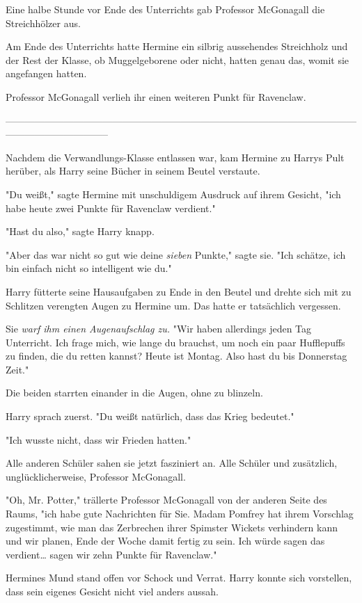 {Eine halbe Stunde vor Ende des Unterrichts gab Professor McGonagall die Streichhölzer aus.

Am Ende des Unterrichts hatte Hermine ein silbrig aussehendes Streichholz und der Rest der Klasse, ob Muggelgeborene oder nicht, hatten genau das, womit sie angefangen hatten.

Professor McGonagall verlieh ihr einen weiteren Punkt für Ravenclaw.

--------------------------------------------------------------------------------------------------------------------------------------------

Nachdem die Verwandlungs-Klasse entlassen war, kam Hermine zu Harrys Pult herüber, als Harry seine Bücher in seinem Beutel verstaute.

"Du weißt," sagte Hermine mit unschuldigem Ausdruck auf ihrem Gesicht, "ich habe heute zwei Punkte für Ravenclaw verdient."

"Hast du also," sagte Harry knapp.

"Aber das war nicht so gut wie deine \emph{sieben} Punkte," sagte sie. "Ich schätze, ich bin einfach nicht so intelligent wie du."

Harry fütterte seine Hausaufgaben zu Ende in den Beutel und drehte sich mit zu Schlitzen verengten Augen zu Hermine um. Das hatte er tatsächlich vergessen.

Sie \emph{warf ihm einen Augenaufschlag zu.} "Wir haben allerdings jeden Tag Unterricht. Ich frage mich, wie lange du brauchst, um noch ein paar Hufflepuffs zu finden, die du retten kannst? Heute ist Montag. Also hast du bis Donnerstag Zeit."

Die beiden starrten einander in die Augen, ohne zu blinzeln.

Harry sprach zuerst. "Du weißt natürlich, dass das Krieg bedeutet."

"Ich wusste nicht, dass wir Frieden hatten."

Alle anderen Schüler sahen sie jetzt fasziniert an. Alle Schüler und zusätzlich, unglücklicherweise, Professor McGonagall.

"Oh, Mr. Potter," trällerte Professor McGonagall von der anderen Seite des Raums, "ich habe gute Nachrichten für Sie. Madam Pomfrey hat ihrem Vorschlag zugestimmt, wie man das Zerbrechen ihrer Spimster Wickets verhindern kann und wir planen, Ende der Woche damit fertig zu sein. Ich würde sagen das verdient… sagen wir zehn Punkte für Ravenclaw."

Hermines Mund stand offen vor Schock und Verrat. Harry konnte sich vorstellen, dass sein eigenes Gesicht nicht viel anders aussah.

}
